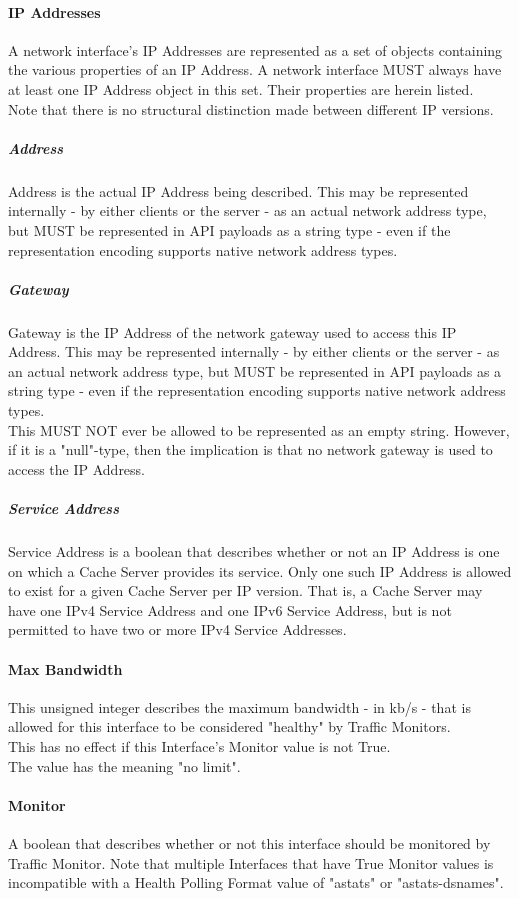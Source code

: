 \paragraph{IP Addresses}
A network interface's IP Addresses are represented as a set of objects containing
the various properties of an IP Address. A network interface MUST always have at
least one IP Address object in this set. Their properties are herein listed.\\
Note that there is no structural distinction made between different IP
versions.

\indent{}\subparagraph{Address}
Address is the actual IP Address being described. This may be represented
internally - by either clients or the server - as an actual network address
type, but MUST be represented in API payloads as a string type - even if the
representation encoding supports native network address types.

\indent{}\subparagraph{Gateway}
Gateway is the IP Address of the network gateway used to access this IP
Address. This may be represented internally - by either clients or the server -
as an actual network address type, but MUST be represented in API payloads as a
string type - even if the representation encoding supports native network
address types.\\
This MUST NOT ever be allowed to be represented as an empty string. However, if
it is a "null"-type, then the implication is that no network gateway is used to
access the IP Address.

\indent{}\subparagraph{Service Address}
Service Address is a boolean that describes whether or not an IP Address is one
on which a Cache Server provides its service. Only one such IP Address is
allowed to exist for a given Cache Server per IP version. That is, a Cache
Server may have one IPv4 Service Address and one IPv6 Service Address, but is
not permitted to have two or more IPv4 Service Addresses.

\paragraph{Max Bandwidth}
This unsigned integer describes the maximum bandwidth - in kb/s - that is
allowed for this interface to be considered "healthy" by Traffic Monitors.\\
This has no effect if this Interface's Monitor value is not True.\\
The value  has the meaning "no limit".

\paragraph{Monitor}
A boolean that describes whether or not this interface should be monitored by
Traffic Monitor. Note that multiple Interfaces that have True Monitor values
is incompatible with a Health Polling Format value of "astats" or
"astats-dsnames".

